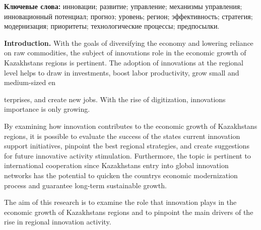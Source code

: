 {\bfseries Ключевые слова:} инновации; развитие; управление; механизмы
управления; инновационный потенциал; прогноз; уровень; регион;
эффективность; стратегия; модернизация; приоритеты; технологические
процессы; предпосылки.

\begin{multicols}{2}
{\bfseries Introduction.} With the goals of diversifying the economy and
lowering reliance on raw commodities, the subject of
innovations\textquotesingle{} role in the economic growth of
Kazakhstan\textquotesingle s regions is pertinent. The adoption of
innovations at the regional level helps to draw in investments, boost
labor productivity, grow small and medium-sized en

terprises, and create new jobs. With the rise of digitization,
innovation\textquotesingle s importance is only growing.

By examining how innovation contributes to the economic growth of
Kazakhstan\textquotesingle s regions, it is possible to evaluate the
success of the state\textquotesingle s current innovation support
initiatives, pinpoint the best regional strategies, and create
suggestions for future innovative activity stimulation. Furthermore, the
topic is pertinent to international cooperation since
Kazakhstan\textquotesingle s entry into global innovation networks has
the potential to quicken the country\textquotesingle s economic
modernization process and guarantee long-term sustainable growth.

The aim of this research is to examine the role that innovation plays in
the economic growth of Kazakhstan\textquotesingle s regions and to
pinpoint the main drivers of the rise in regional innovation activity.


\end{multicols}
